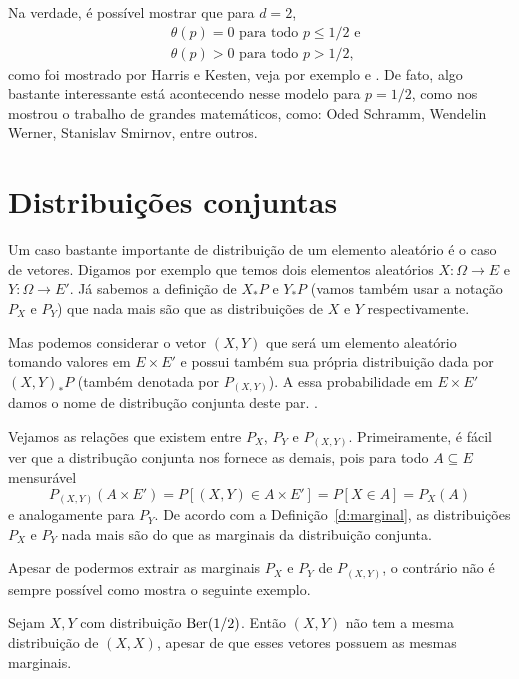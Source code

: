 \begin{topics}
Na verdade, é possível mostrar que para $d = 2$,
\begin{equation}
  \begin{split}
    & \text{$\theta(p) = 0$ para todo $p \leq 1/2$ e}\\
    & \text{$\theta(p) > 0$ para todo $p > 1/2$,}
  \end{split}
\end{equation}
como foi mostrado por Harris e Kesten, veja por exemplo \cite{Gri99} e \cite{bollobas2006percolation}.
De fato, algo bastante interessante está acontecendo nesse modelo para $p = 1/2$, como nos mostrou o trabalho de grandes matemáticos, como: Oded Schramm, Wendelin Werner, Stanislav Smirnov, entre outros.


\end{topics}

\section{Distribuições conjuntas}

Um caso bastante importante de distribuição de um elemento aleatório é o caso de vetores.
Digamos por exemplo que temos dois elementos aleatórios $X:\Omega \to E$ e $Y:\Omega \to E'$.
Já sabemos a definição de $X_*P$ e $Y_*P$ (vamos também usar a notação $P_X$ e $P_Y$) que nada mais são que as distribuições de $X$ e $Y$ respectivamente.

Mas podemos considerar o vetor $(X, Y)$ que será um elemento aleatório tomando valores em $E \times E'$ e possui também sua própria distribuição dada por $(X, Y)_*P$ (também denotada por $P_{(X, Y)}$).
A essa probabilidade em $E \times E'$ damos o nome de distribução conjunta deste par. .

Vejamos as relações que existem entre $P_X$, $P_Y$ e $P_{(X,Y)}$.
Primeiramente, é fácil ver que a distribução conjunta nos fornece as demais, pois para todo $A \subseteq E$ mensurável
\begin{equation}
  P_{(X,Y)}(A \times E') = P[(X, Y) \in A \times E'] = P[X \in A] = P_X(A)
\end{equation}
e analogamente para $P_Y$.
De acordo com a Definição~\ref{d:marginal}, as distribuições $P_X$ e $P_Y$ nada mais são do que as marginais da distribuição conjunta.

Apesar de podermos extrair as marginais $P_X$ e $P_Y$ de $P_{(X,Y)}$, o contrário não é sempre possível como mostra o seguinte exemplo.
\begin{example}
  Sejam $X, Y$ \iid com distribuição $\operatorname{Ber}(1/2)$.
  Então $(X, Y)$ não tem a mesma distribuição de $(X, X)$, apesar de que esses vetores possuem as mesmas marginais.
\end{example}

